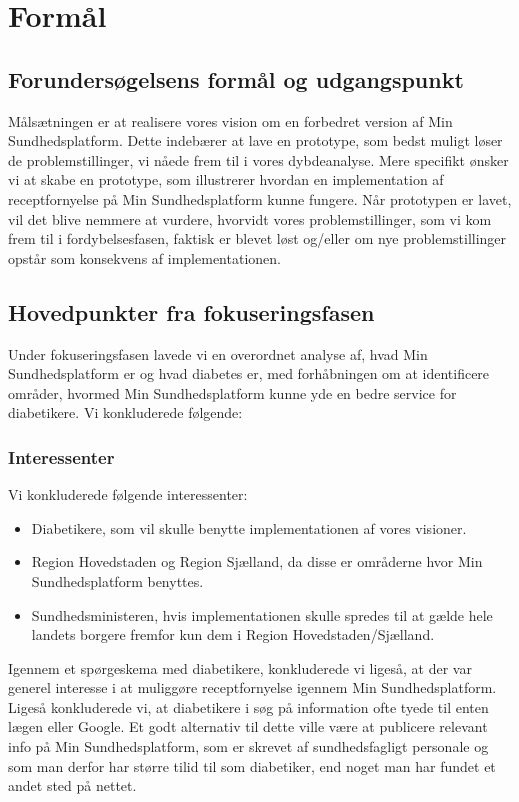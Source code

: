 \section{Formål}
\subsection{Forundersøgelsens formål og udgangspunkt}
Målsætningen er at realisere vores vision om en forbedret version af Min Sundhedsplatform. Dette indebærer at lave en prototype, som bedst muligt løser de problemstillinger, vi nåede frem til i vores dybdeanalyse. Mere specifikt ønsker vi at skabe en prototype, som illustrerer hvordan en implementation af receptfornyelse på Min Sundhedsplatform kunne fungere. Når prototypen er lavet, vil det blive nemmere at vurdere, hvorvidt vores problemstillinger, som vi kom frem til i fordybelsesfasen, faktisk er blevet løst og/eller om nye problemstillinger opstår som konsekvens af implementationen. 
\subsection{Hovedpunkter fra fokuseringsfasen}
Under fokuseringsfasen lavede vi en overordnet analyse af, hvad Min Sundhedsplatform er og hvad diabetes er, med forhåbningen om at identificere områder, hvormed Min Sundhedsplatform kunne yde en bedre service for diabetikere. Vi konkluderede følgende:
\subsubsection{Interessenter}
Vi konkluderede følgende interessenter:
\begin{itemize}
\item Diabetikere, som vil skulle benytte implementationen af vores visioner.
\item Region Hovedstaden og Region Sjælland, da disse er områderne hvor Min Sundhedsplatform benyttes.
\item Sundhedsministeren, hvis implementationen skulle spredes til at gælde hele landets borgere fremfor kun dem i Region Hovedstaden/Sjælland.
\end{itemize}
Igennem et spørgeskema med diabetikere, konkluderede vi ligeså, at der var generel interesse i at muliggøre receptfornyelse igennem Min Sundhedsplatform.\\
Ligeså konkluderede vi, at diabetikere i søg på information ofte tyede til enten lægen eller Google. Et godt alternativ til dette ville være at publicere relevant info på Min Sundhedsplatform, som er skrevet af sundhedsfagligt personale og som man derfor har større tilid til som diabetiker, end noget man har fundet et andet sted på nettet. 

